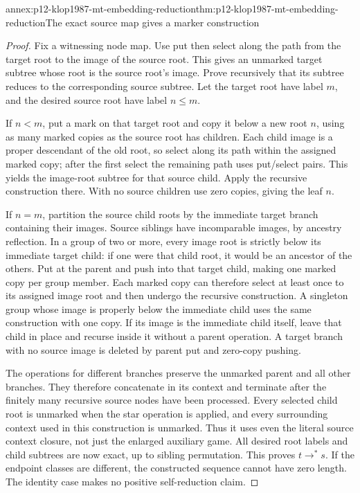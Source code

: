 \begin{annexitem}{annex:p12-klop1987-mt-embedding-reduction}{thm:p12-klop1987-mt-embedding-reduction}{The exact source map gives a marker construction}
\begin{proof}
Fix a witnessing node map. Use put then select along the path from
the target root to the image of the source root. This gives an
unmarked target subtree whose root is the source root's image.
Prove recursively that its subtree reduces to the corresponding
source subtree. Let the target root have label \(m\), and the
desired source root have label \(n\leq m\).

If \(n<m\), put a mark on that target root and copy it below a
new root \(n\), using as many marked copies as the source root
has children. Each child image is a proper descendant of the old
root, so select along its path within the assigned marked copy;
after the first select the remaining path uses put/select pairs.
This yields the image-root subtree for that source child. Apply the
recursive construction there. With no source children use zero
copies, giving the leaf \(n\).

If \(n=m\), partition the source child roots by the immediate target
branch containing their images. Source siblings have incomparable
images, by ancestry reflection. In a group of two or more, every
image root is strictly below its immediate target child: if one were
that child root, it would be an ancestor of the others. Put at the
parent and push into that target child, making one marked copy per
group member. Each marked copy can therefore select at least once
to its assigned image root and then undergo the recursive construction.
A singleton group whose image is properly below the immediate child
uses the same construction with one copy. If its image is the
immediate child itself, leave that child in place and recurse inside
it without a parent operation. A target branch with no source image
is deleted by parent put and zero-copy pushing.

The operations for different branches preserve the unmarked parent
and all other branches. They therefore concatenate in its context
and terminate after the finitely many recursive source nodes have
been processed. Every selected child root is unmarked when the
star operation is applied, and every surrounding context used in
this construction is unmarked. Thus it uses even the literal source
context closure, not just the enlarged auxiliary game.
All desired root labels and child subtrees are now exact, up to sibling
permutation. This proves \(t\to^*s\). If the endpoint classes
are different, the constructed sequence cannot have zero length.
The identity case makes no positive self-reduction claim.
\end{proof}
\end{annexitem}


